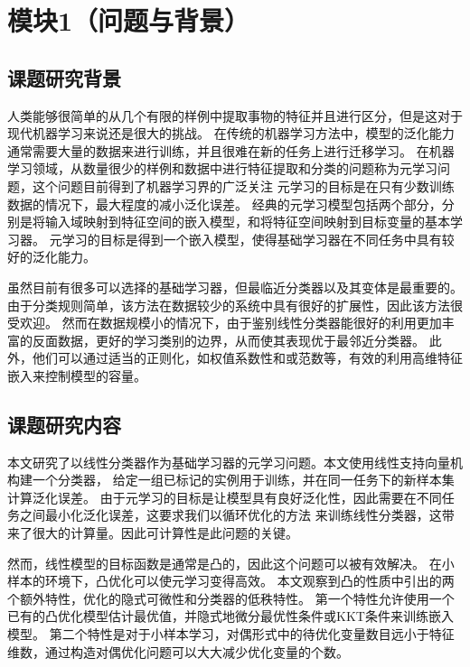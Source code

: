 

\chapter{模块1（问题与背景）}

\section{课题研究背景}

人类能够很简单的从几个有限的样例中提取事物的特征并且进行区分，但是这对于现代机器学习来说还是很大的挑战。
在传统的机器学习方法中，模型的泛化能力通常需要大量的数据来进行训练，并且很难在新的任务上进行迁移学习。
在机器学习领域，从数量很少的样例和数据中进行特征提取和分类的问题称为元学习问题，这个问题目前得到了机器学习界的广泛关注
元学习的目标是在只有少数训练数据的情况下，最大程度的减小泛化误差。
经典的元学习模型包括两个部分，分别是将输入域映射到特征空间的嵌入模型，和将特征空间映射到目标变量的基本学习器。
元学习的目标是得到一个嵌入模型，使得基础学习器在不同任务中具有较好的泛化能力。

虽然目前有很多可以选择的基础学习器，但最临近分类器以及其变体是最重要的。
由于分类规则简单，该方法在数据较少的系统中具有很好的扩展性，因此该方法很受欢迎。
然而在数据规模小的情况下，由于鉴别线性分类器能很好的利用更加丰富的反面数据，更好的学习类别的边界，从而使其表现优于最邻近分类器。
此外，他们可以通过适当的正则化，如权值系数性和或范数等，有效的利用高维特征嵌入来控制模型的容量。


\section{课题研究内容}

本文研究了以线性分类器作为基础学习器的元学习问题。本文使用线性支持向量机构建一个分类器，
给定一组已标记的实例用于训练，并在同一任务下的新样本集计算泛化误差。
由于元学习的目标是让模型具有良好泛化性，因此需要在不同任务之间最小化泛化误差，这要求我们以循环优化的方法
来训练线性分类器，这带来了很大的计算量。因此可计算性是此问题的关键。

然而，线性模型的目标函数是通常是凸的，因此这个问题可以被有效解决。
在小样本的环境下，凸优化可以使元学习变得高效。
本文观察到凸的性质中引出的两个额外特性，优化的隐式可微性和分类器的低秩特性\cite{barratt2018differentiability,gould2016differentiating}。
第一个特性允许使用一个已有的凸优化模型估计最优值，并隐式地微分最优性条件或KKT条件来训练嵌入模型。
第二个特性是对于小样本学习，对偶形式中的待优化变量数目远小于特征维数，通过构造对偶优化问题可以大大减少优化变量的个数。


